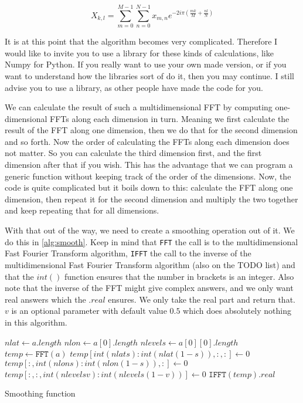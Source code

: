 \begin{equation}
    X_{k,l} = \sum_{m = 0}^{M - 1}\sum_{n = 0}^{N - 1} x_{m, n}e^{-2i\pi(\frac{mk}{M} + \frac{nl}{N})}
    \label{eq:NFFT}
\end{equation}

It is at this point that the algorithm becomes very complicated. Therefore I would like to invite you to use a library for these kinds of calculations, like Numpy \cite{numpy} for Python. If you
really want to use your own made version, or if you want to understand how the libraries sort of do it, then you may continue. I still advise you to use a library, as other people have made the 
code for you. 

We can calculate the result of such a multidimensional FFT by computing one-dimensional FFTs along each dimension in turn. Meaning we first calculate the result of the FFT along one dimension, 
then we do that for the second dimension and so forth. Now the order of calculating the FFTs along each dimension does not matter. So you can calculate the third dimension first, and the first 
dimension after that if you wish. This has the advantage that we can program a generic function without keeping track of the order of the dimensions. Now, the code is quite complicated but it 
boils down to this: calculate the FFT along one dimension, then repeat it for the second dimension and multiply the two together and keep repeating that for all dimensions.

With that out of the way, we need to create a smoothing operation out of it. We do this in \autoref{alg:smooth}. Keep in mind that \texttt{FFT} the call is to the 
multidimensional Fast Fourier Transform algorithm, \texttt{IFFT} the call to the inverse of the multidimensional Fast Fourier Transform algorithm (also on the TODO list) and that the $int()$ 
function ensures that the number in brackets is an integer. Also note that the inverse of the FFT might give complex answers, and we only want real answers which the $.real$ ensures. We only 
take the real part and return that. $v$ is an optional parameter with default value $0.5$ which does absolutely nothing in this algorithm.

\begin{algorithm}
    $nlat \leftarrow a.length$ \;
    $nlon \leftarrow a[0].length$ \;
    $nlevels \leftarrow a[0][0].length$ \;
    $temp \leftarrow \texttt{FFT}(a)$ \;
    $temp[int(nlat s):int(nlat(1 - s)),:,:] \leftarrow 0$ \;
    $temp[:,int(nlon s):int(nlon(1 - s)),:] \leftarrow 0$ \;
    $temp[:,:,int(nlevels v):int(nlevels(1 - v))] \leftarrow 0$ \;
    \Return $\texttt{IFFT}(temp).real$ \;
    \caption{Smoothing function}
    \label{alg:smooth}
\end{algorithm}
